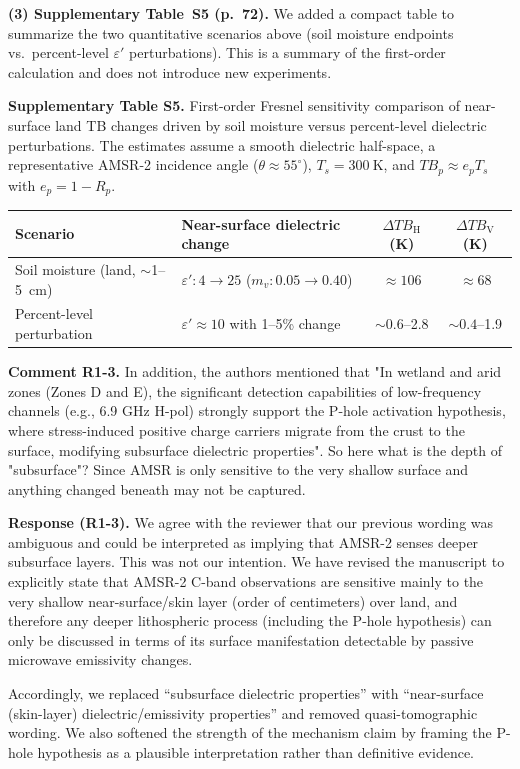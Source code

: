 \documentclass[11pt]{article}
\newcommand{\revcomment}[1]{\begingroup\color{commentcolor}#1\endgroup}
\newcommand{\revresponse}[1]{\begingroup\color{responsecolor}#1\endgroup}
\begin{document}
{\medskip

\textbf{(3) Supplementary Table~S5 (p.~72).} We added a compact table to summarize the two quantitative scenarios above (soil moisture endpoints vs.\ percent-level $\varepsilon'$ perturbations). This is a summary of the first-order calculation and does not introduce new experiments.

\medskip

{\footnotesize
\textbf{Supplementary Table S5.} First-order Fresnel sensitivity comparison of near-surface land TB changes driven by soil moisture versus percent-level dielectric perturbations. The estimates assume a smooth dielectric half-space, a representative AMSR-2 incidence angle ($\theta \approx 55^{\circ}$), $T_s = 300~\mathrm{K}$, and $TB_p \approx e_p T_s$ with $e_p = 1 - R_p$.

\medskip

\centering
\begin{tabular}{@{}llcc@{}}
\toprule
Scenario & Near-surface dielectric change & $\Delta TB_{\mathrm{H}}$ (K) & $\Delta TB_{\mathrm{V}}$ (K) \\
\midrule
Soil moisture (land, $\sim$1--5~cm) & $\varepsilon': 4 \rightarrow 25$ ($m_v: 0.05 \rightarrow 0.40$) & $\approx 106$ & $\approx 68$ \\
Percent-level perturbation & $\varepsilon' \approx 10$ with 1--5\% change & $\sim 0.6$--2.8 & $\sim 0.4$--1.9 \\
\bottomrule
\end{tabular}
\par
}
}

\bigskip

\revcomment{%
\textbf{Comment R1-3.}
In addition, the authors mentioned that "In wetland and arid zones (Zones D and E), the significant detection capabilities of low-frequency channels (e.g., 6.9 GHz H-pol) strongly support the P-hole activation hypothesis, where stress-induced positive charge carriers migrate from the crust to the surface, modifying subsurface dielectric properties". So here what is the depth of "subsurface"? Since AMSR is only sensitive to the very shallow surface and anything changed beneath may not be captured.
}

\revresponse{%
\textbf{Response (R1-3).}
We agree with the reviewer that our previous wording was ambiguous and could be interpreted as implying that AMSR-2 senses deeper subsurface layers. This was not our intention. We have revised the manuscript to explicitly state that AMSR-2 C-band observations are sensitive mainly to the very shallow near-surface/skin layer (order of centimeters) over land, and therefore any deeper lithospheric process (including the P-hole hypothesis) can only be discussed in terms of its surface manifestation detectable by passive microwave emissivity changes.

\medskip

Accordingly, we replaced ``subsurface dielectric properties'' with ``near-surface (skin-layer) dielectric/emissivity properties'' and removed quasi-tomographic wording. We also softened the strength of the mechanism claim by framing the P-hole hypothesis as a plausible interpretation rather than definitive evidence.
}
\end{document}
